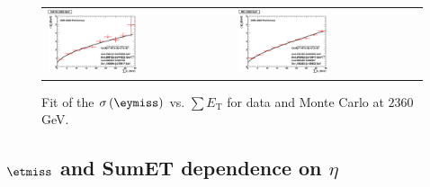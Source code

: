 \begin{figure}[h!]
 \centering
 \begin{tabular}{ll}
  \includegraphics[width=0.5\textwidth]{plots_DataVsMC_MB_2360GeV/final_metysigma_sumet_DATA_2360.eps} &
  \includegraphics[width=0.5\textwidth]{plots_DataVsMC_MB_2360GeV/final_metysigma_sumet_MC_2360.eps} \\
 \end{tabular}
 \caption{\small Fit of the $\sigma\left(\eymiss\right)$ vs. $\sum E_\text{T}$ for data and Monte Carlo at $2360$ GeV.\label{fig:MEySigma_vs_SumET_2360_fit}}
\end{figure}

\clearpage

\subsection{$\etmiss$ and SumET dependence on $\eta$}

